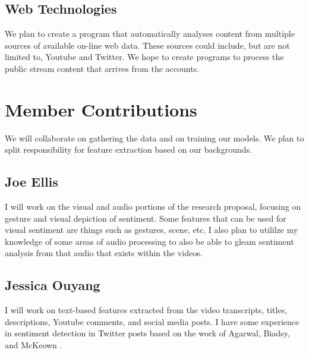 \documentclass[paper=a4, fontsize=11pt]{scrartcl} %
\begin{document}
\subsection{Web Technologies}
We plan to create a program that automatically analyses content from multiple sources of available on-line web data.
These sources could include, but are not limited to, Youtube and Twitter.
We hope to create programs to process the public stream content that arrives from the accounts.

\section{Member Contributions}

We will collaborate on gathering the data and on training our models.  We plan to split responsibility for feature extraction based on our backgrounds.

\subsection{Joe Ellis}
I will work on the visual and audio portions of the research proposal, focusing on gesture and visual depiction of sentiment. 
Some features that can be used for visual sentiment are things such as gestures, scene, etc. 
I also plan to utililze my knowledge of some areas of audio processing to also be able to gleam sentiment analysis from that audio that exists within the videos.

\subsection{Jessica Ouyang}
I will work on text-based features extracted from the video transcripts, titles, descriptions, Youtube comments, and social media posts.  
I have some experience in sentiment detection in Twitter posts based on the work of Agarwal, Biadsy, and McKeown \cite{agarwal2009contextual}.  






\end{document}
